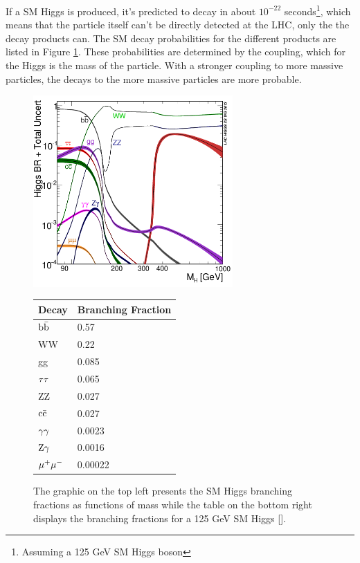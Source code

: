 If a SM Higgs is produced, it's predicted to decay in about $10^{-22}$ seconds\footnote{Assuming a 125 GeV SM Higgs boson}, which means that the particle itself can't be directly detected at the LHC, only the the decay products can. The SM decay probabilities for the different products are listed in Figure \ref{fig:hbranch}. These probabilities are determined by the coupling, which for the Higgs is the mass of the particle. With a stronger coupling to more massive particles, the decays to the more massive particles are more probable.
\begin{figure}[h!]
  \centering
  \includegraphics[width=3in]{images/Higgs_BR.png}
  \begin{tabular}{ ll }
    \hline
    Decay & Branching Fraction \\
    \hline
    ${\rm b\bar{b}}$ & 0.57 \\
    WW & 0.22\\
    gg & 0.085 \\
    ${\rm \tau\tau}$ & 0.065 \\
    ZZ & 0.027 \\
    ${\rm c\bar{c}}$ & 0.027 \\
    ${\rm \gamma\gamma}$ & 0.0023 \\
    ${\rm Z}\gamma$ & 0.0016 \\
    ${\rm \mu^{+}\mu^{-}}$ & 0.00022 \\
    \hline
  \end{tabular} 
  \caption
{The graphic on the top left presents the SM Higgs branching fractions as functions of mass while the table on the bottom right displays the branching fractions for a 125 GeV SM Higgs [\cite{crossbranchplots}].}
  \label{fig:hbranch}
\end{figure}


